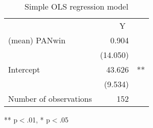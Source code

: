 \documentclass{article}
\begin{document}
\begin{table}[!h]
\caption{Simple OLS regression model}
\centering
\begin{tabular}{lll}
\cline{1-3}
\multicolumn{1}{r}{} &
  \multicolumn{2}{c}{Y} \\
\cline{1-3}
\multicolumn{1}{l}{(mean) PANwin} &
  \multicolumn{1}{r}{0.904} &
  \multicolumn{1}{l}{} \\
\multicolumn{1}{l}{} &
  \multicolumn{1}{r}{(14.050)} &
  \multicolumn{1}{l}{} \\
\multicolumn{1}{l}{Intercept} &
  \multicolumn{1}{r}{43.626} &
  \multicolumn{1}{l}{**} \\
\multicolumn{1}{l}{} &
  \multicolumn{1}{r}{(9.534)} &
  \multicolumn{1}{l}{} \\
\multicolumn{1}{l}{Number of observations} &
  \multicolumn{1}{r}{152} &
  \multicolumn{1}{l}{} \\
\cline{1-3}
\end{tabular}

\footnotesize{
** p$<$.01, * p$<$.05
}
\end{table}
\end{document}
